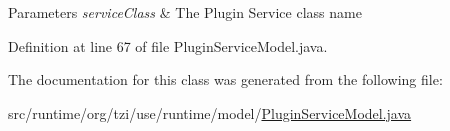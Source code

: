 \begin{DoxyParams}{Parameters}
{\em service\-Class} & The Plugin Service class name \\
\hline
\end{DoxyParams}


Definition at line 67 of file Plugin\-Service\-Model.\-java.



The documentation for this class was generated from the following file\-:\begin{DoxyCompactItemize}
\item 
src/runtime/org/tzi/use/runtime/model/\hyperlink{_plugin_service_model_8java}{Plugin\-Service\-Model.\-java}\end{DoxyCompactItemize}
